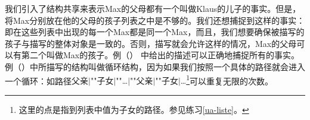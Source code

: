 我们引入了结构共享来表示Max的父母都有一个叫做Klaus的儿子的事实。但是，将Max分别放在他的父母的孩子列表之中是不够的。我们还想捕捉到这样的事实：即在这些列表中出现的每一个Max都是同一个Max，而且，我们想要确保被描写的孩子与描写的整体对象是一致的。否则，描写就会允许这样的情况，Max的父母可以有第二个叫做Max的孩子。例（）
中给出的描述可以正确地捕捉所有的事实。
\ea
\label{bsp-avm-zyklen}
 
\z
例（）中所描写的结构叫做循环结构，因为如果我们按照一个具体的路径就会进入一个循环：如路径\textsc{父亲$|$""子女$|$""\ldots$|$""父亲$|$""子女$|$\ldots}\footnote{%
这里的点是指到列表中值为\textsc{子女}的路径。参见练习\ref{ua-liste}。
}可以重复无限的次数。

